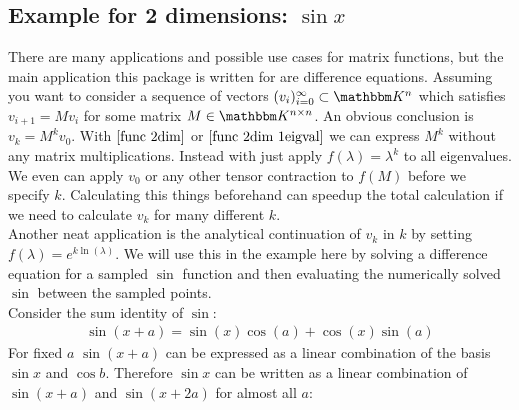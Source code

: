 \documentclass[12pt]{article}
\begin{document}
\subsection{Example for 2 dimensions: $\sin x$}
There are many applications and possible use cases for matrix functions, but the main application this package is written for are difference equations. Assuming you want to consider a sequence of vectors $(v_i)_{i=0}^\infty \subset \mathbbm K^n$ which satisfies $v_{i+1} = M v_i$ for some matrix $M\in \mathbbm K^{n\times n}$. An obvious conclusion is $v_k = M^k v_0$. With $\eqref{func 2dim}$ or $\eqref{func 2dim 1eigval}$ we can express $M^k$ without any matrix multiplications. Instead with just apply $f(\lambda) = \lambda^k$ to all eigenvalues. We even can apply $v_0$ or any other tensor contraction to $f(M)$ before we specify $k$. Calculating this things beforehand can speedup the total calculation if we need to calculate $v_k$ for many different $k$.\\
Another neat application is the analytical continuation of $v_k$ in $k$ by setting $f(\lambda) = e^{k \ln(\lambda)}$. We will use this in the example here by solving a difference equation for a sampled $\sin$ function and then evaluating the numerically solved $\sin$ between the sampled points.\\
Consider the sum identity of $\sin$:
\begin{align}
\sin(x+a) = \sin(x)\cos(a) + \cos(x)\sin(a) \label{sin(a+b)}
\end{align}
For fixed $a$ $\sin(x+a)$ can be expressed as a linear combination of the basis $\sin x$ and $\cos b$. Therefore $\sin x$ can be written as a linear combination of $\sin(x+a)$ and $\sin(x+2a)$ for almost all $a$:
\end{document}
